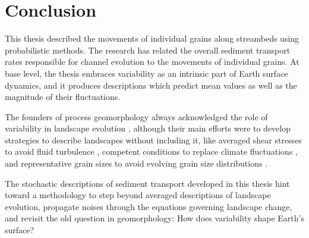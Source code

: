 \section{Conclusion}

This thesis described the movements of individual grains along streambeds using probabilistic methods.
The research has related the overall sediment transport rates responsible for channel evolution to the movements of individual grains.
At base level, the thesis embraces variability as an intrinsic part of Earth surface dynamics, and it produces descriptions which predict mean values as well as the magnitude of their fluctuations.

The founders of process geomorphology always acknowledged the role of variability in landscape evolution \citep{Horton1945,Strahler1952,Langbein1964}, although their main efforts were to develop strategies to describe landscapes without including it, like averaged shear stresses to avoid fluid turbulence \citep{MeyerPeter1948,Bagnold1954}, competent conditions to replace climate fluctuations \citep{Wolman1959,Wolman1978}, and representative grain sizes to avoid evolving grain size distributions \citep{Parker1982,Andrews1983}.

The stochastic descriptions of sediment transport developed in this thesis hint toward a methodology to step beyond averaged descriptions of landscape evolution, propagate noises through the equations governing landscape change, and revisit the old question in geomorphology: How does variability shape Earth's surface?

\endinput

Its closest neighbours may be rarefied hillslope transport, where solitary grains tumble down hillslopes \citep{Williams2021}, and intense bedload transport, where particles creep downstream in a dense granular flow, supported by collisions with other moving grains \citep{Frey2014}. These phenomena differ only by viscosity or density, not mechanically. 



\citet{Ashworth1989} and \citet{Warburton1992} identified three phases of bedload transport in gravel-bed streams that occur as the flow increases. Phase 1 is characterized by movement of sand only, while gravel remains stationary; phase 2 involves partial mobility of the smaller gravel sizes; and phase 3 is the full mobility of all grain sizes represented on the bed.
Phase 2 is most common in gravel-bed rivers, but phase 3 has 